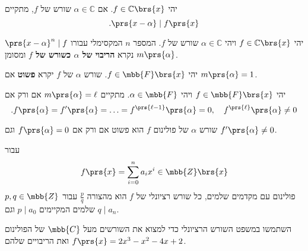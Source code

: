 \documentclass[article, 10pt,oneside]{article}
\renewcommand{\emph}[1]{\textbf{#1}}
\begin{document}
\begin{corollary}
יהי
$f \in \mathbb{C}\brs{x}$.
אם
$\alpha \in \mathbb{C}$
שורש של
$f$,
מתקיים
\[\text{.}\prs{x - \alpha} \mid f\prs{x}\]
\end{corollary}

\begin{definition}
יהי
$f \in \mathbb{C}\brs{x}$
ויהי
$\alpha \in \mathbb{C}$
שורש של
$f$.
המספר
$n$
המקסימלי עבורו
$\prs{x-\alpha}^n \mid f$
נקרא
\emph{
הריבוי של
$\alpha$
כשורש של
$f$
}
ומסומן
$m\prs{\alpha}$.
\end{definition}

\begin{definition}
יהי
$f \in \mbb{F}\brs{x}$.
שורש
$\alpha$
של
$f$
יקרא
\emph{פשוט}
אם
$m\prs{\alpha} = 1$.
\end{definition}

\begin{proposition}
יהי
$f \in \mbb{F}\brs{x}$
ויהי
$\alpha \in \mbb{F}$.
מתקיים
$m\prs{\alpha} = \ell$
אם ורק אם
\[\text{.} f\prs{\alpha} = f'\prs{\alpha} = \ldots = f^{\prs{\ell-1}}\prs{\alpha} = 0, \quad f^{\prs{\ell}}\prs{\alpha} \neq 0\]
\end{proposition}

\begin{corollary}
שורש
$\alpha$
של פולינום
$f$
הוא פשוט אם ורק אם
$f\prs{\alpha} = 0$
וגם
$f'\prs{\alpha} \neq 0$.
\end{corollary}

\begin{theorem}
עבור
\[f\prs{x} = \sum_{i=0}^n a_i x^i \in \mbb{Z}\brs{x}\]
פולינום עם מקדמים שלמים,
כל שורש רציונלי של
$f$
הוא מהצורה
$\frac{p}{q}$
עבור
$p,q \in \mbb{Z}$
שלמים המקיימים
$p \mid a_0$
וגם
$q \mid a_n$.
\end{theorem}

\begin{exercise}
השתמשו במשפט השורש הרציונלי כדי למצוא את השורשים מעל
$\mbb{C}$
של הפולינום
$f\prs{x} = 2x^3 - x^2 - 4x + 2$
ואת הריבויים שלהם.
\end{exercise}
\end{document}
